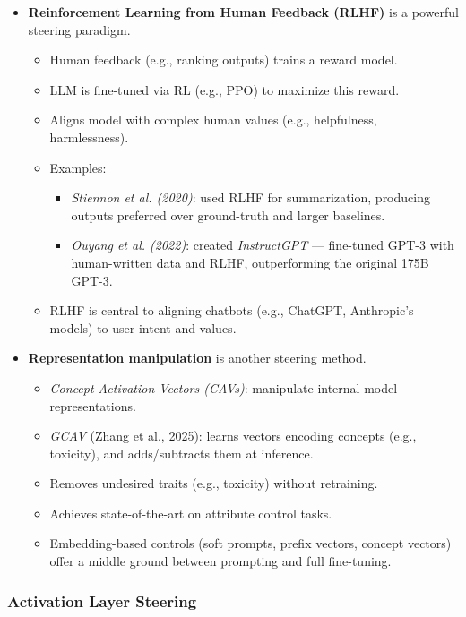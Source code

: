 \begin{itemize}
  \item \textbf{Reinforcement Learning from Human Feedback (RLHF)} is a powerful steering paradigm.
        \begin{itemize}
          \item Human feedback (e.g., ranking outputs) trains a reward model.
          \item LLM is fine-tuned via RL (e.g., PPO) to maximize this reward.
          \item Aligns model with complex human values (e.g., helpfulness, harmlessness).
          \item Examples:
                \begin{itemize}
                  \item \textit{Stiennon et al. (2020)}: used RLHF for summarization, producing outputs preferred over ground-truth and larger baselines.
                  \item \textit{Ouyang et al. (2022)}: created \textit{InstructGPT} — fine-tuned GPT-3 with human-written data and RLHF, outperforming the original 175B GPT-3.
                \end{itemize}
          \item RLHF is central to aligning chatbots (e.g., ChatGPT, Anthropic’s models) to user intent and values.
        \end{itemize}

  \item \textbf{Representation manipulation} is another steering method.
        \begin{itemize}
          \item \textit{Concept Activation Vectors (CAVs)}: manipulate internal model representations.
          \item \textit{GCAV} (Zhang et al., 2025): learns vectors encoding concepts (e.g., toxicity), and adds/subtracts them at inference.
          \item Removes undesired traits (e.g., toxicity) without retraining.
          \item Achieves state-of-the-art on attribute control tasks.
          \item Embedding-based controls (soft prompts, prefix vectors, concept vectors) offer a middle ground between prompting and full fine-tuning.
        \end{itemize}
\end{itemize}

\subsubsection*{Activation Layer Steering}

